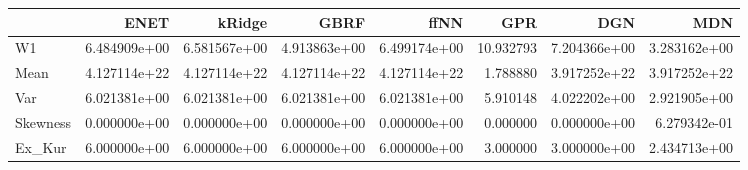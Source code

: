 \begin{tabular}{lrrrrrrr}
\toprule
{} &          ENET &        kRidge &          GBRF &          ffNN &        GPR &           DGN &           MDN \\
\midrule
W1       &  6.484909e+00 &  6.581567e+00 &  4.913863e+00 &  6.499174e+00 &  10.932793 &  7.204366e+00 &  3.283162e+00 \\
Mean     &  4.127114e+22 &  4.127114e+22 &  4.127114e+22 &  4.127114e+22 &   1.788880 &  3.917252e+22 &  3.917252e+22 \\
Var      &  6.021381e+00 &  6.021381e+00 &  6.021381e+00 &  6.021381e+00 &   5.910148 &  4.022202e+00 &  2.921905e+00 \\
Skewness &  0.000000e+00 &  0.000000e+00 &  0.000000e+00 &  0.000000e+00 &   0.000000 &  0.000000e+00 &  6.279342e-01 \\
Ex\_Kur   &  6.000000e+00 &  6.000000e+00 &  6.000000e+00 &  6.000000e+00 &   3.000000 &  3.000000e+00 &  2.434713e+00 \\
\bottomrule
\end{tabular}
